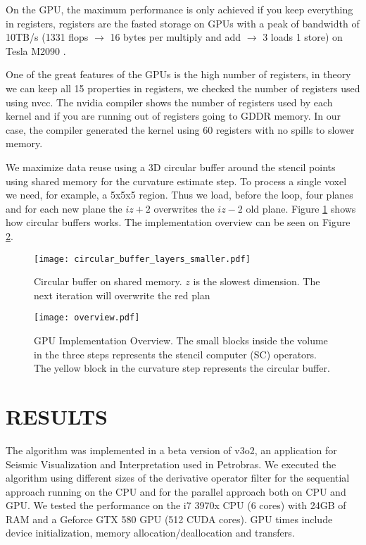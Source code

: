 \documentclass[conference]{IEEEtran}
\begin{document}
On the GPU, the maximum performance is only achieved if you keep everything in registers, registers are the fasted storage on GPUs with a peak of bandwidth of 10TB/s (1331 flops $\rightarrow$ 16 bytes per multiply and add $\rightarrow$ 3 loads 1 store)  on Tesla M2090 \cite{nvidia}.

One of the great features of the GPUs is the high number of registers, in theory we can keep all 15 properties in registers, we checked the number of registers used using nvcc. The nvidia compiler
shows the number of registers used by each kernel and if you are running out of registers going to GDDR memory. In our case, the compiler generated the kernel using 60 registers with no spills to
slower memory.

We maximize data reuse using a 3D circular buffer around the stencil points using shared memory for the curvature estimate step. To process a single voxel we need, for example, a 5x5x5 region. Thus we load, before the loop, four planes and for each new plane the $iz + 2$ overwrites the $iz - 2$ old plane. Figure \ref{fig:circular_buffer} shows how circular buffers works. The implementation overview can be seen on Figure \ref{fig:overview}.


\begin{figure}
  \centering
  \texttt{[image: circular\_buffer\_layers\_smaller.pdf]}
  \caption{Circular buffer on shared memory. $z$ is the slowest dimension. The next iteration will overwrite the red plan }
  \label{fig:circular_buffer}
\end{figure}

\begin{figure}
  \centering
  \texttt{[image: overview.pdf]}
  \caption{ GPU Implementation Overview. The small blocks inside the volume in the three steps represents the stencil computer (SC) operators. The yellow block in the curvature step represents the circular buffer. }
  \label{fig:overview}
\end{figure}


\section{RESULTS} \label{sec:results}

The algorithm was implemented in a beta version of v3o2, an application for Seismic Visualization and Interpretation used in Petrobras. We executed the algorithm using different sizes of the derivative operator filter for the sequential approach running on the CPU and for the parallel approach both on CPU and GPU. We tested the performance on the i7 3970x CPU (6 cores) with 24GB of RAM and a Geforce GTX 580 GPU (512 CUDA cores). GPU times include device initialization, memory allocation/deallocation and transfers.
\end{document}
